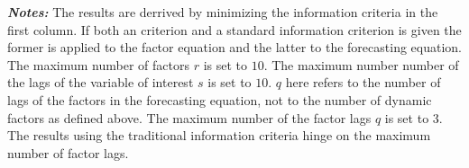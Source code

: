 \documentclass[11pt]{article}
\begin{document}
\begin{table}[ht]
	\caption{Dynamic factor model, model selection}
	\label{results dynamic factor model}
	\centering

	\begin{minipage}{15cm}
		\small{\textbf{\textit{Notes:}} The results are derrived by minimizing the information criteria in the first column. If both an \citet{bai2002determining} criterion and a standard information criterion is given the former is applied to the factor equation and the latter to the forecasting equation. The maximum number of factors $r$ is set to $10$. The maximum number number of the lags of the variable of interest $s$ is set to $10$. $q$ here refers to the number of lags of the factors in the forecasting equation, not to the number of dynamic factors as defined above. The maximum number of the factor lags $q$ is set to 3. The results using the traditional information criteria hinge on the maximum number of factor lags.}
	\end{minipage}
\end{table}
\end{document}
